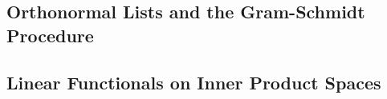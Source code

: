 \subsection{Orthonormal Lists and the Gram-Schmidt Procedure}

\subsection{Linear Functionals on Inner Product Spaces}